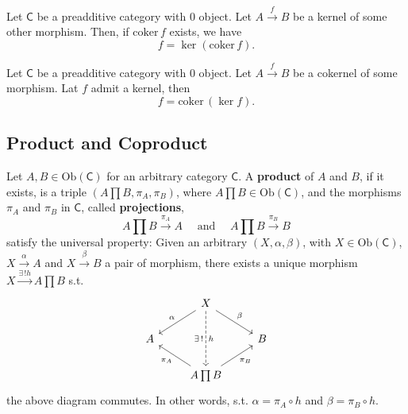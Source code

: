 \begin{lem}
	Let $\mathsf{C}$ be a preadditive category with $0$ object.
	Let $A \xrightarrow{f} B$ be a kernel of some other morphism.
	Then, if $\mathrm{coker}\, f$ exists, we have
	\begin{equation}
		f = \ker \left( \mathrm{coker}\, f \right)
	.\end{equation} 
\end{lem} 

\begin{lem}
	Let $\mathsf{C}$ be a preadditive category with $0$ object.
	Let $A \xrightarrow{f} B$ be a cokernel of some morphism.
	Lat $f$ admit a kernel, then
	\begin{equation}
		f = \mathrm{coker}\, \left( \ker f \right)
	.\end{equation} 
\end{lem} 

\subsection{Product and Coproduct}

\begin{defn}[Product]
	Let $A, B \in \mathrm{Ob} \left(\mathsf{C}\right)$ for an arbitrary category $\mathsf{C}$.
	A \textbf{product} of $A$ and $B$, if it exists, is a triple $\left(A \prod B, \pi_A, \pi_B \right)$, where $A \prod B \in \mathrm{Ob} \left(\mathsf{C}\right)$, and the morphisms $\pi_A$ and $\pi_B$ in $\mathsf{C}$, called \textbf{projections}, 
	 \begin{equation}
	A \prod B \xrightarrow{\pi_A} A \quad \text{ and } \quad A \prod B \xrightarrow{\pi_B} B
	\end{equation} 
	satisfy the universal property:
	Given an arbitrary $\left(X, \alpha, \beta\right)$, with $X \in \mathrm{Ob} \left(\mathsf{C}\right)$, $X \xrightarrow{\alpha} A$ and $X \xrightarrow{\beta} B$ a pair of morphism, there exists a unique morphism $X \xrightarrow{\exists\, ! h} A \prod B$ s.t.
	\begin{equation}
	\begin{tikzcd}
		& X \arrow[ld, "\alpha"', rightarrow] \arrow[rd, "\beta", rightarrow] \arrow[dd, "h", "\exists\, !"', dashrightarrow] \\
		A & & B\\
		  & A \prod B \arrow[lu, "\pi_A", rightarrow] \arrow[ru, "\pi_B"', rightarrow] &
	\end{tikzcd}
	\end{equation} 
	the above diagram commutes.
	In other words, s.t. $\alpha = \pi_A \circ h$ and $\beta = \pi_B \circ h$.
\end{defn}

